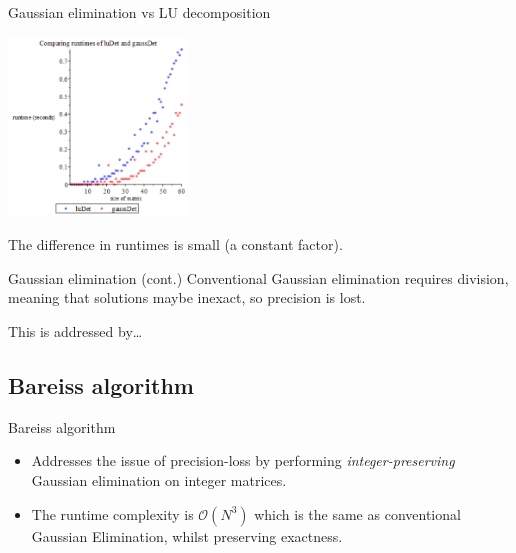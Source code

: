 \documentclass{beamer}
\begin{document}
\begin{frame}{Gaussian elimination vs LU decomposition}
    \begin{center}{}
        \includegraphics[height=180]{lu-gauss}
    \end{center}

    The difference in runtimes is small (a constant factor).
\end{frame}

\begin{frame}{Gaussian elimination (cont.)}
    Conventional Gaussian elimination requires division, meaning that solutions maybe inexact,
    so precision is lost.

    This is addressed by\dots
\end{frame}

\subsection{Bareiss algorithm}

\begin{frame}{Bareiss algorithm}

    \begin{itemize}

        \item Addresses the issue of precision-loss by performing \emph{integer-preserving}
            Gaussian elimination on integer matrices.

        \item The runtime complexity is $\mathcal{O}(N^3)$ which is the same as conventional
            Gaussian Elimination, whilst preserving exactness.


    \end{itemize}


\end{frame}
\end{document}
